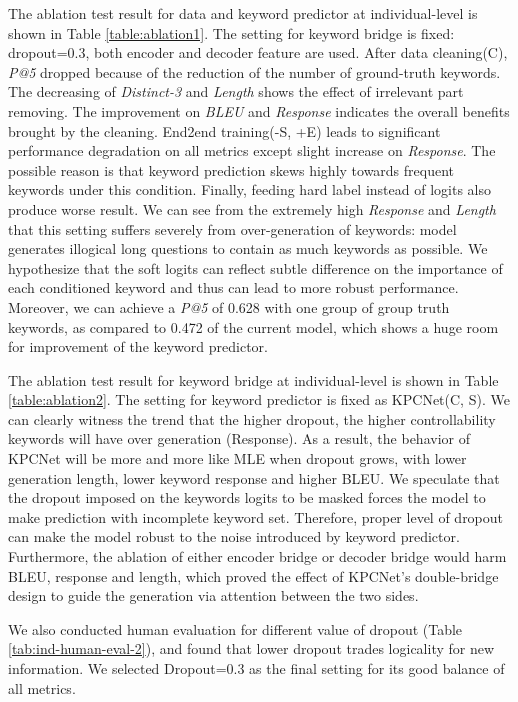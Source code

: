 The ablation test result for data and keyword predictor at individual-level is shown in Table \ref{table:ablation1}. The setting for keyword bridge is fixed: dropout=0.3, both encoder and decoder feature are used. After data cleaning(C), \textit{P@5} dropped because of the reduction of the number of ground-truth keywords. The decreasing of \textit{Distinct-3} and \textit{Length} shows the effect of irrelevant part removing. The improvement on \textit{BLEU} and \textit{Response} indicates the overall benefits brought by the cleaning. End2end training(-S, +E) leads to significant performance degradation on all metrics except slight increase on \textit{Response}. The possible reason is that keyword prediction skews highly towards frequent keywords under this condition. Finally, feeding hard label instead of logits also produce worse result. We can see from the extremely high \textit{Response} and \textit{Length} that this setting suffers severely from over-generation of keywords: model generates illogical long questions to contain as much keywords as possible. We hypothesize that the soft logits can reflect subtle difference on the importance of each conditioned keyword and thus can lead to more robust performance. Moreover, we can achieve a \textit{P@5} of 0.628 with one group of group truth keywords, as compared to 0.472 of the current model, which shows a huge room for improvement of the keyword predictor.


  The ablation test result for keyword bridge at individual-level is shown in Table \ref{table:ablation2}. The setting for keyword predictor is fixed as KPCNet(C, S). We can clearly witness the trend that the higher dropout, the higher controllability keywords will have over generation (Response). As a result, the behavior of KPCNet will be more and more like MLE when dropout grows, with lower generation length, lower keyword response and higher BLEU. We speculate that the dropout imposed on the keywords logits to be masked forces the model to make prediction with incomplete keyword set. Therefore, proper level of dropout can make the model robust to the noise introduced by keyword predictor. Furthermore, the ablation of either encoder bridge or decoder bridge would harm BLEU, response and length, which proved the effect of KPCNet's double-bridge design to guide the generation via attention between the two sides. 


We also conducted human evaluation for different value of dropout (Table \ref{tab:ind-human-eval-2}), and found that lower dropout trades logicality for new information. We selected Dropout=0.3 as the final setting for its good balance of all metrics.
 